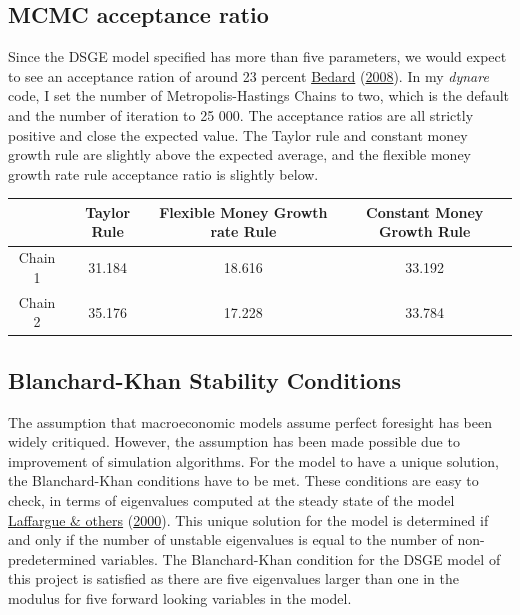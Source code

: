 \documentclass[11pt,preprint, authoryear]{elsarticle}
\let\origtable\table
\let\endorigtable\endtable
\renewenvironment{table}[1][2] {
    \expandafter\origtable\expandafter[H]
} {
    \endorigtable
}
\numberwithin{equation}{section}
\numberwithin{figure}{section}
\numberwithin{table}{section}
\begin{document}
\hypertarget{mcmc-acceptance-ratio}{%
\subsection{MCMC acceptance ratio}\label{mcmc-acceptance-ratio}}

Since the DSGE model specified has more than five parameters, we would
expect to see an acceptance ration of around 23 percent
\protect\hyperlink{ref-bedard2008optimal}{Bedard}
(\protect\hyperlink{ref-bedard2008optimal}{2008}). In my \emph{dynare}
code, I set the number of Metropolis-Hastings Chains to two, which is
the default and the number of iteration to 25 000. The acceptance ratios
are all strictly positive and close the expected value. The Taylor rule
and constant money growth rule are slightly above the expected average,
and the flexible money growth rate rule acceptance ratio is slightly
below.

\begin{table}
\caption{MCMC acceptance ratio (precent)}
 \label{mcmc_acceptance}
 \begin{center}
\begin{tabular}{|c|c|c|c|} 
\hline
   & Taylor Rule & Flexible Money Growth rate Rule & Constant Money Growth Rule \\ 
\hline
 Chain 1 & 31.184 & 18.616 & 33.192 \\
 Chain 2 & 35.176 & 17.228 & 33.784 \\
\hline
\end{tabular}
\end{center}
\end{table}

\hypertarget{blanchard-khan-stability-conditions}{%
\subsection{Blanchard-Khan Stability
Conditions}\label{blanchard-khan-stability-conditions}}

The assumption that macroeconomic models assume perfect foresight has
been widely critiqued. However, the assumption has been made possible
due to improvement of simulation algorithms. For the model to have a
unique solution, the Blanchard-Khan conditions have to be met. These
conditions are easy to check, in terms of eigenvalues computed at the
steady state of the model
\protect\hyperlink{ref-laffargue2000blanchard}{Laffargue \& others}
(\protect\hyperlink{ref-laffargue2000blanchard}{2000}). This unique
solution for the model is determined if and only if the number of
unstable eigenvalues is equal to the number of non-predetermined
variables. The Blanchard-Khan condition for the DSGE model of this
project is satisfied as there are five eigenvalues larger than one in
the modulus for five forward looking variables in the model.
\end{document}
